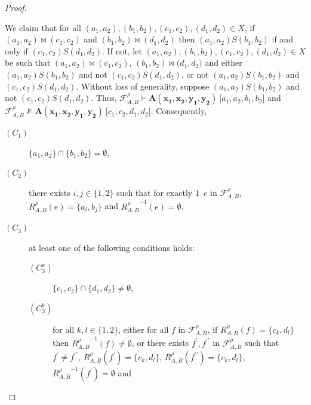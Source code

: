 \documentclass[10pt,a4paper]{amsart}
\begin{document}
\begin{proof}
\begin{itemize}
%
%
\end{itemize}
%
%
We claim that for all $(a_{1},a_{2}),(b_{1},b_{2}),(c_{1},c_{2}),(d_{1},d_{2}){\in}X$, if $(a_{1},a_{2}){\bowtie}(c_{1},c_{2})$ and $(b_{1},b_{2}){\bowtie}(d_{1},d_{2})$ then $(a_{1},a_{2}){S}(b_{1},b_{2})$ if and only if $(c_{1},c_{2}){S}(d_{1},d_{2})$.
If not, let $(a_{1},a_{2}),(b_{1},b_{2}),(c_{1},c_{2}),(d_{1},d_{2}){\in}X$ be such that $(a_{1},a_{2}){\bowtie}(c_{1},c_{2})$, $(b_{1},b_{2}){\bowtie}(d_{1},
%
%
%
%
%
%
%
%
%
%
%
%
$\linebreak$
%
%
%
%
%
%
%
%
%
%
%
%
d_{2})$ and either $(a_{1},a_{2}){S}(b_{1},b_{2})$ and not $(c_{1},c_{2}){S}(d_{1},d_{2})$, or not $(a_{1},a_{2}){S}(b_{1},b_{2})$ and $(c_{1},c_{2}){S}(d_{1},d_{2})$.
Without loss of generality, suppose $(a_{1},a_{2}){S}(b_{1},b_{2})$ and not $(c_{1},c_{2}){S}(d_{1},d_{2})$.
Thus, ${\mathcal F}^{\rho}_{A,B}{\models}\mathbf{A}(\mathbf{x_{1}},\mathbf{x_{2}},\mathbf{y_{1}},\mathbf{y_{2}})\ \lbrack a_{1},a_{2},b_{1},b_{2}\rbrack$ and ${\mathcal F}^{\rho}_{A,B}{\not\models}
%
%
%
%
%
%
%
%
%
%
%
%
$\linebreak$
%
%
%
%
%
%
%
%
%
%
%
%
\mathbf{A}(\mathbf{x_{1}},\mathbf{x_{2}},\mathbf{y_{1}},\mathbf{y_{2}})\ \lbrack c_{1},c_{2},d_{1},d_{2}\rbrack$.
Consequently,
%
%
\begin{description}
%
%
\item[$(C_{1})$] $\{a_{1},a_{2}\}{\cap}\{b_{1},b_{2}\}{=}\emptyset$,
%
%
\item[$(C_{2})$] there exists $i,j{\in}\{1,2\}$ such that for exactly $1$~$e$ in ${\mathcal F}_{A,B}^{\rho}$, $R_{A,B}^{\rho}(e){=}\{a_{i},b_{j}\}$ and ${R_{A,B}^{\rho}}^{{-}1}(e){=}\emptyset$,
%
%
\item[$(C_{3})$] at least one of the following conditions holds:
%
%
\begin{description}
%
%
\item[$(C_{3}^{a})$] $\{c_{1},c_{2}\}{\cap}\{d_{1},d_{2}\}{\not=}\emptyset$,
%
%
\item[$(C_{3}^{b})$] for all $k,l{\in}\{1,2\}$, either for all $f$ in ${\mathcal F}_{A,B}^{\rho}$, if $R_{A,B}^{\rho}(f){=}\{c_{k},d_{l}\}$ then ${R_{A,B}^{\rho}}^{{-}1}(f){\not=}\emptyset$, or there exists $f^{\prime},f^{\prime\prime}$ in ${\mathcal F}_{A,B}^{\rho}$ such that $f^{\prime}{\not=}f^{\prime\prime}$,
%
%
%
%
%
%
%
%
%
%
%
%
\linebreak$
%
%
%
%
%
%
%
%
%
%
%
%
R_{A,B}^{\rho}(f^{\prime}){=}\{c_{k},d_{l}\}$, $R_{A,B}^{\rho}(f^{\prime\prime}){=}\{c_{k},d_{l}\}$, ${R_{A,B}^{\rho}}^{{-}1}(f^{\prime}){=}\emptyset$ and

\end{description}
\end{description}
\end{proof}
\end{document}
